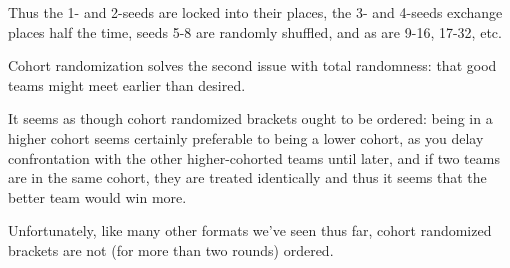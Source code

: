 {    Thus the 1- and 2-seeds are locked into their places, the 3- and 4-seeds exchange places half the time, seeds 5-8 are randomly shuffled, and as are 9-16, 17-32, etc. 
    

    
    Cohort randomization solves the second issue with total randomness: that good teams might meet earlier than desired.
    

    It seems as though cohort randomized brackets ought to be ordered: being in a higher cohort seems certainly preferable to being a lower cohort, as you delay confrontation with the other higher-cohorted teams until later, and if two teams are in the same cohort, they are treated identically and thus it seems that the better team would win more.

    Unfortunately, like many other formats we've seen thus far, cohort randomized brackets are not (for more than two rounds) ordered. 


    }
